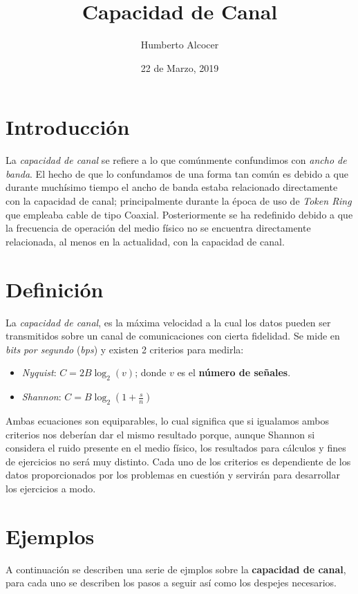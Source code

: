 \documentclass{article}
\title{Capacidad de Canal}
\author{Humberto Alcocer}
\date{22 de Marzo, 2019}
\begin{document}
\maketitle

\section{Introducción}

La \textit{capacidad de canal} se refiere a lo que comúnmente confundimos con \textit{ancho de banda}.
El hecho de que lo confundamos de una forma tan común es debido a que durante muchísimo tiempo el ancho de banda estaba relacionado directamente con la capacidad de canal; principalmente durante la época de uso de \textit{Token Ring} que empleaba cable de tipo Coaxial. Posteriormente se ha redefinido debido a que la frecuencia de operación del medio físico no se encuentra directamente relacionada, al menos en la actualidad, con la capacidad de canal.

\section{Definición}

La \textit{capacidad de canal}, es la máxima velocidad a la cual los datos pueden ser transmitidos sobre un canal de comunicaciones con cierta fidelidad. Se mide en \textit{bits por segundo} (\textit{bps}) y existen 2 criterios para medirla:

\begin{itemize}
  \item \textit{Nyquist}: $C = 2B\log_{2}(v)$; donde $v$ es el \textbf{número de señales}.
  \item \textit{Shannon}: $C = B\log_{2}(1+\frac{s}{n})$
\end{itemize}

Ambas ecuaciones son equiparables, lo cual significa que si igualamos ambos criterios nos deberían dar el mismo resultado porque, aunque Shannon si considera
el ruido presente en el medio físico, los resultados para cálculos y fines de ejercicios no será muy distinto.
Cada uno de los criterios es dependiente de los datos proporcionados por los problemas en cuestión y servirán para desarrollar los ejercicios a modo.

\section{Ejemplos}

A continuación se describen una serie de ejmplos sobre la \textbf{capacidad de canal}, para cada uno se describen los pasos a seguir así como los despejes necesarios.
\end{document}
